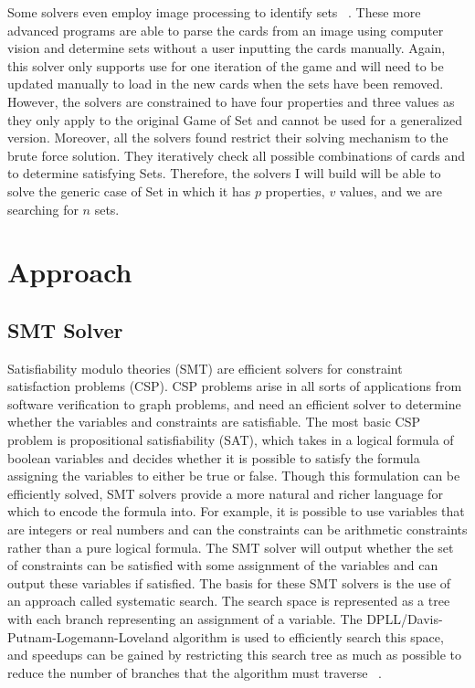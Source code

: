 \documentclass[pageno]{jpaper}
\begin{document}
Some solvers even employ image processing to identify sets ~\cite{jorquera}. These more advanced programs are able to parse the cards from an image using computer vision and determine sets without a user inputting the cards manually. Again, this solver only supports use for one iteration of the game and will need to be updated manually to load in the new cards when the sets have been removed. However, the solvers are constrained to have four properties and three values as they only apply to the original Game of Set and cannot be used for a generalized version. Moreover, all the solvers found restrict their solving mechanism to the brute force solution. They iteratively check all possible combinations of cards and to determine satisfying Sets. Therefore, the solvers I will build will be able to solve the generic case of Set in which it has $p$ properties, $v$ values, and we are searching for $n$ sets. 


\section{Approach}

\subsection{SMT Solver}
Satisfiability modulo theories (SMT) are efficient solvers for constraint satisfaction problems (CSP). CSP problems arise in all sorts of applications from software verification to graph problems, and need an efficient solver to determine whether the variables and constraints are satisfiable. The most basic CSP problem is propositional satisfiability (SAT), which takes in a logical formula of boolean variables and decides whether it is possible to satisfy the formula assigning the variables to either be true or false. Though this formulation can be efficiently solved, SMT solvers provide a more natural and richer language for which to encode the formula into. For example, it is possible to use variables that are integers or real numbers and can the constraints can be arithmetic constraints rather than a pure logical formula. The SMT solver will output whether the set of constraints can be satisfied with some assignment of the variables and can output these variables if satisfied. The basis for these SMT solvers  is the use of an approach called systematic search. The search space is represented as a tree with each branch representing an assignment of a variable. The DPLL/Davis-Putnam-Logemann-Loveland algorithm is used to efficiently search this space, and speedups can be gained by restricting this search tree as much as possible to reduce the number of branches that the algorithm must traverse ~\cite{SMTbackground}.
\end{document}
